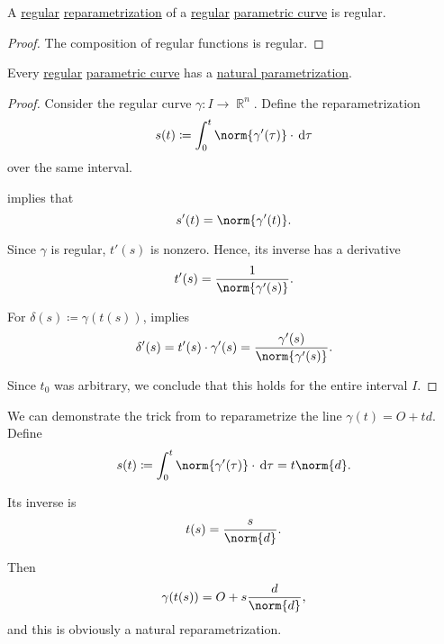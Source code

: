 \begin{proposition}\label{thm:regular_reparametrization}
  A \hyperref[def:function_regular_at_point]{regular} \hyperref[def:parametric_curve_reparametrization]{reparametrization} of a \hyperref[def:smooth_curve/regular]{regular} \hyperref[def:parametric_curve]{parametric curve} is regular.
\end{proposition}
\begin{proof}
  The composition of regular functions is regular.
\end{proof}

\begin{proposition}\label{thm:natural_reparametrization}
  Every \hyperref[def:smooth_curve/regular]{regular} \hyperref[def:parametric_curve]{parametric curve} has a \hyperref[def:smooth_curve/natural_parameter]{natural parametrization}.
\end{proposition}
\begin{proof}
  Consider the regular curve \( \gamma: I \to \BbbR^n \). Define the reparametrization
  \begin{equation*}
    s(t) \coloneqq \int_0^t \norm{\gamma'(\tau)} \cdot \dl \tau
  \end{equation*}
  over the same interval.

   implies that
  \begin{equation*}
    s'(t) = \norm{\gamma'(t)}.
  \end{equation*}

  Since \( \gamma \) is regular, \( t'(s) \) is nonzero. Hence, its inverse has a derivative
  \begin{equation*}
    t'(s) = \frac 1 {\norm{\gamma'(s)}}.
  \end{equation*}

  For \( \delta(s) \coloneqq \gamma(t(s)) \),  implies
  \begin{equation*}
    \delta'(s)
    =
    t'(s) \cdot \gamma'(s)
    =
    \frac {\gamma'(s)} {\norm{\gamma'(s)}}.
  \end{equation*}

  Since \( t_0 \) was arbitrary, we conclude that this holds for the entire interval \( I \).
\end{proof}

\begin{example}\label{ex:natural_reparametrization_of_line}
  We can demonstrate the trick from  to reparametrize the line \( \gamma(t) = O + td \). Define
  \begin{equation*}
    s(t) \coloneqq \int_0^t \norm{\gamma'(\tau)} \cdot \dl \tau = t \norm{d}.
  \end{equation*}

  Its inverse is
  \begin{equation*}
    t(s) = \frac s {\norm{d}}.
  \end{equation*}

  Then
  \begin{equation*}
    \gamma(t(s)) = O + s \frac d {\norm{d}},
  \end{equation*}
  and this is obviously a natural reparametrization.
\end{example}

